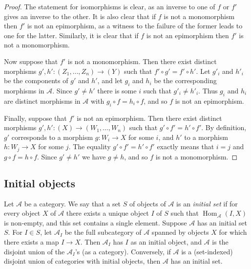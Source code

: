 \documentclass[12pt]{amsart}
\newcommand{\Acom}[1]{\textcolor{blue}{[#1]}}
\numberwithin{equation}{section}
\theoremstyle{definition}
\newtheorem{rmk}[equation]{Remark}
\newenvironment{remark}[1][]{\begin{rmk}[#1] \pushQED{\qed}}{\popQED \end{rmk}}
\newcommand{\cA}{\mathcal{A}}
\newcommand{\cB}{\mathcal{B}}
\newcommand{\bS}{\mathbf{S}}
\newcommand{\bT}{\mathbf{T}}
\newcommand{\defn}[1]{\emph{#1}}
\renewcommand{\AA}{\mathbb{A}}
\DeclareMathOperator{\Hom}{Hom}
\newcommand{\op}{\mathrm{op}}
\begin{document}
\begin{proof}
The statement for isomorphisms is clear, as an inverse to one of $f$ or $f'$ gives an inverse to the other. It is also clear that if $f$ is not a monomorphism then $f'$ is not an epimorphism, as a witness to the failure of the former leads to one for the latter. Similarly, it is clear that if $f$ is not an epimorphism then $f'$ is not a monomorphism.

Now suppose that $f'$ is not a monomorphism. Then there exist distinct morphisms $g', h' \colon (Z_1,\ldots,Z_n) \to (Y)$ such that $f' \circ g'=f' \circ h'$. Let $g'_i$ and $h'_i$ be the components of $g'$ and $h'$, and let $g_i$ and $h_i$ be the corresponding morphisms in $\cA$. Since $g' \ne h'$ there is some $i$ such that $g'_i \ne h'_i$. Thus $g_i$ and $h_i$ are distinct morphisms in $\cA$ with $g_i \circ f = h_i \circ f$, and so $f$ is not an epimorphism.

Finally, suppose that $f'$ is not an epimorphism. Then there exist distinct morphisms $g', h' \colon (X) \to (W_1, \ldots, W_n)$ such that $g' \circ f' = h' \circ f'$. By definition, $g'$ corresponds to a morphism $g \colon W_i \to X$ for some $i$, and $h'$ to a morphism $h \colon W_j \to X$ for some $j$. The equality $g' \circ f'=h' \circ f'$ exactly means that $i=j$ and $g \circ f = h \circ f$. Since $g' \ne h'$ we have $g \ne h$, and so $f$ is not a monomorphism.
\end{proof}


\subsection{Initial objects}

Let $\cA$ be a category. We say that a set $S$ of objects of $\cA$ is an \defn{initial set} if for every object $X$ of $\cA$ there exists a unique object $I$ of $S$ such that $\Hom_{\cA}(I,X)$ is non-empty, and this set contains a single element. Suppose $\cA$ has an initial set $S$. For $I \in S$, let $\cA_I$ be the full subcategory of $\cA$ spanned by objects $X$ for which there exists a map $I \to X$. Then $\cA_I$ has $I$ as an initial object, and $\cA$ is the disjoint union of the $\cA_I$'s (as a category). Conversely, if $\cA$ is a (set-indexed) disjoint union of categories with initial objects, then $\cA$ has an initial set.
\end{document}
